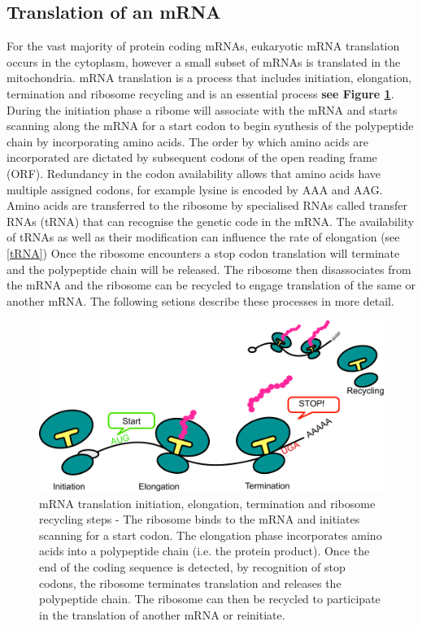 \documentclass[12pt,openany]{book}
\begin{document}
\subsection{Translation of an mRNA} For the vast majority of protein
coding mRNAs, eukaryotic mRNA translation occurs in the cytoplasm,
however a small subset of mRNAs is translated in the mitochondria. mRNA
translation is a process that includes initiation, elongation,
termination and ribosome recycling and is an essential process
\textbf{see Figure \ref{fig:doodlemRNASteps}}. During the initiation
phase a ribome will associate with the mRNA and starts scanning along
the mRNA for a start codon to begin synthesis of the polypeptide chain
by incorporating amino acids. The order by which amino acids are
incorporated are dictated by subsequent codons of the open reading frame
(ORF). Redundancy in the codon availability allows that amino acids have
multiple assigned codons, for example lysine is encoded by AAA and AAG.
Amino acids are transferred to the ribosome by specialised RNAs called
transfer RNAs (tRNA) that can recognise the genetic code in the mRNA.
The availability of tRNAs as well as their modification can influence
the rate of elongation (see \ref{tRNA}) Once the ribosome encounters a
stop codon translation will terminate and the polypeptide chain will be
released. The ribosome then disassociates from the mRNA and the ribosome
can be recycled to engage translation of the same or another mRNA. The
following setions describe these processes in more detail.

\begin{figure}
  \includegraphics{./figures/doodleTranslation.pdf}
  \caption{mRNA translation initiation, elongation, termination and ribosome recycling steps - The ribosome binds to the mRNA and initiates scanning for a start codon. The elongation phase incorporates amino acids into a polypeptide chain (i.e. the protein product). Once the end of the coding sequence is detected, by recognition of stop codons, the ribosome terminates translation and releases the polypeptide chain. The ribosome can then be recycled to participate in the translation of another mRNA or reinitiate. \label{fig:doodlemRNASteps}}
\end{figure}
\end{document}
